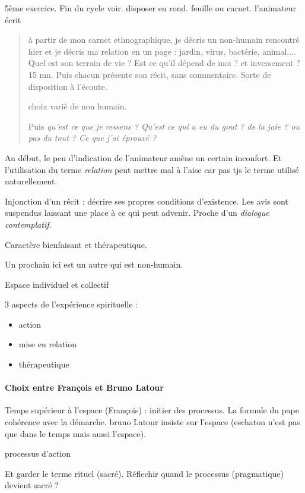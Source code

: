 \begin{Ex}
    5ème exercice. Fin du cycle voir.
    disposer en rond. feuille ou carnet.
    l'animateur écrit
    \begin{quote}
        à partir de mon carnet ethnographique, je décris un non-humain rencontré hier et je décris ma relation en un page : jardin, virus, bactérie, animal,... 
        Quel est son terrain de vie ? Est ce qu'il dépend de moi ? et inversement ?
        15 mn. 
        Puis chacun présente son récit, sans commentaire.  Sorte de disposition à l'écoute.

 choix varié de non humain.

 Puis \textit{qu'est ce que je ressens ? Qu'est ce qui a eu du gout ? de la joie ? ou pas du tout ? Ce que j'ai éprouvé ? }
    \end{quote}

Au début, le peu d'indication de l'animateur amène un certain inconfort. Et l'utilisation du terme \textit{relation} peut mettre mal à l'aise car pas tjs le terme utilisé naturellement.

Injonction d'un récit : décrire ses propres conditions d'existence. Les avis sont suspendus laissant une place à ce qui peut advenir. 
Proche d'un \textit{dialogue contemplatif}.

Caractère bienfaisant et thérapeutique. 

Un prochain ici est un autre qui est non-humain. 

Espace individuel et collectif 

3 aspects de l'expérience spirituelle : 
\begin{itemize}
\item action
\item mise en relation
\item thérapeutique
\end{itemize}

\paragraph{Choix entre François et Bruno Latour} Temps supérieur à l'espace (François) : initier des processus. La formule du pape cohérence avec la démarche. 
bruno Latour insiste sur l'espace (eschaton n'est pas que dans le temps mais aussi l'espace). 


\end{Ex}

\begin{Def}[exercice]
processus  d'action
    
\end{Def}
Et garder le terme rituel (sacré). Réflechir quand le processus (pragmatique) devient sacré ?

